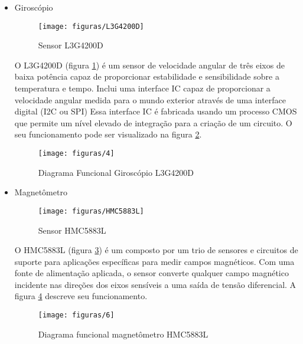\begin{itemize}
\pagebreak

  \item Giroscópio

		\begin{figure}[H]
			\centering
			\caption{Sensor L3G4200D}
			\label{img:L3G4200D}
			\texttt{[image: figuras/L3G4200D]}
		\end{figure}

		O L3G4200D (figura \ref{img:L3G4200D}) é um sensor de velocidade angular de três eixos de baixa potência capaz de proporcionar estabilidade e sensibilidade sobre a temperatura e tempo. Inclui uma interface IC capaz de proporcionar a velocidade angular medida para o mundo exterior através de uma interface digital (I2C ou SPI) Essa interface IC é fabricada usando um processo CMOS que permite um nível elevado de integração para a criação de um circuito. O seu funcionamento pode ser visualizado na figura \ref{img:giroscopio}.

	  \begin{figure}[H]
	    \centering
	    \caption[Diagrama Funcional Giroscópio L3G4200D]{Diagrama Funcional Giroscópio L3G4200D~\cite{giroscopio}}
	    \label{img:giroscopio}
	    \texttt{[image: figuras/4]}
	  \end{figure}

\pagebreak

  \item Magnetômetro

		\begin{figure}[H]
			\centering
			\caption{Sensor HMC5883L}
			\label{img:HMC5883L}
			\texttt{[image: figuras/HMC5883L]}
		\end{figure}

		O HMC5883L (figura \ref{img:HMC5883L}) é um composto por um trio de sensores e circuitos de suporte para aplicações específicas para medir campos magnéticos. Com uma fonte de alimentação aplicada, o sensor converte qualquer campo magnético incidente nas direções dos eixos sensíveis a uma saída de tensão diferencial. A figura \ref{img:magnetometro} descreve seu funcionamento.

	  \begin{figure}[H]
	    \centering
	    \caption[Diagrama funcional magnetômetro HMC5883L]{Diagrama funcional magnetômetro HMC5883L~\cite{magnetometro}}
	    \label{img:magnetometro}
	    \texttt{[image: figuras/6]}
	  \end{figure}
	  
\pagebreak


\end{itemize}
